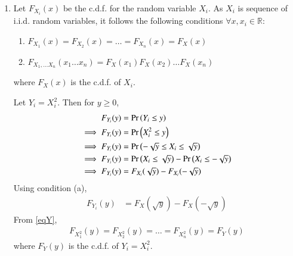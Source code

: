 \documentclass[journal,12pt,twocolumn]{IEEEtran}
\begin{document}
\begin{enumerate}
\item Let $F_{X_i}(x)$ be the c.d.f. for the random variable $X_i$.
As ${X_i}$ is sequence of i.i.d. random variables, it follows the following conditions $\forall x,x_i \in \mathbb{R}$:
    \begin{enumerate}
        \item \begin{math}F_{X_1}(x)=F_{X_2}(x)=\ldots=F_{X_n}(x)=F_X(x)\end{math}
        \item \begin{math}F_{X_1,\ldots X_n}(x_1\ldots x_n)=F_X(x_1)F_X(x_2)\ldots F_X(x_n)\end{math}
    \end{enumerate}
where $F_X(x)$ is the c.d.f. of $X_i$.

Let $Y_i=X_i^2$. Then for $y \geq 0$,
\begin{align}
    F_{Y_i}(y)&=\Pr\left(Y_i \leq y\right)\\
    \implies F_{Y_i}(y)&=\Pr\left(X_i^2 \leq y\right)\\
    \implies F_{Y_i}(y)&=\Pr\left(-\sqrt{y} \leq X_i \leq \sqrt{y}\right)\label{eqref}\\
    \implies F_{Y_i}(y)&=\Pr\left(X_i \leq \sqrt{y}\right)-\Pr\left(X_i \leq -\sqrt{y}\right)\\
    \implies F_{Y_i}(y)&=F_{X_i}(\sqrt{y})-F_{X_i}(-\sqrt{y})
\end{align}
Using condition (a),
\begin{align} 
    F_{Y_i}(y)&=F_X(\sqrt{y})-F_X(-\sqrt{y})\label{eqY}
\end{align}
From \eqref{eqY},
\begin{align} 
    F_{X_1^2}(y)=F_{X_2^2}(y)=\ldots=F_{X_n^2}(y)=F_Y(y)\label{condnA}
\end{align}
where $F_Y(y)$ is the c.d.f. of $Y_i=X_i^2$.


\end{enumerate}
\end{document}
